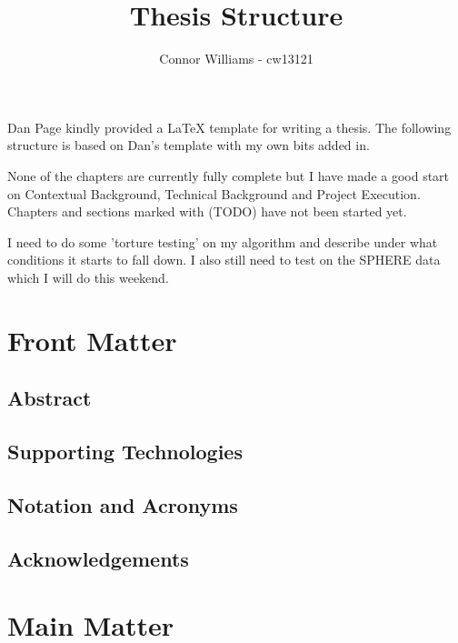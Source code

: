 \documentclass{article}
\begin{document}
\title{Thesis Structure}
\author{Connor Williams - cw13121}
\date{}
\maketitle

Dan Page kindly provided a LaTeX template for writing a thesis. The following structure is based on Dan's template with my own bits added in.

None of the chapters are currently fully complete but I have made a good start on Contextual Background, Technical Background and Project Execution. Chapters and sections marked with (TODO) have not been started yet.

I need to do some 'torture testing' on my algorithm and describe under what conditions it starts to fall down. I also still need to test on the SPHERE data which I will do this weekend.

\section{Front Matter}
\subsection{Abstract}
\subsection{Supporting Technologies}
\subsection{Notation and Acronyms}
\subsection{Acknowledgements}

\section{Main Matter}
\end{document}
